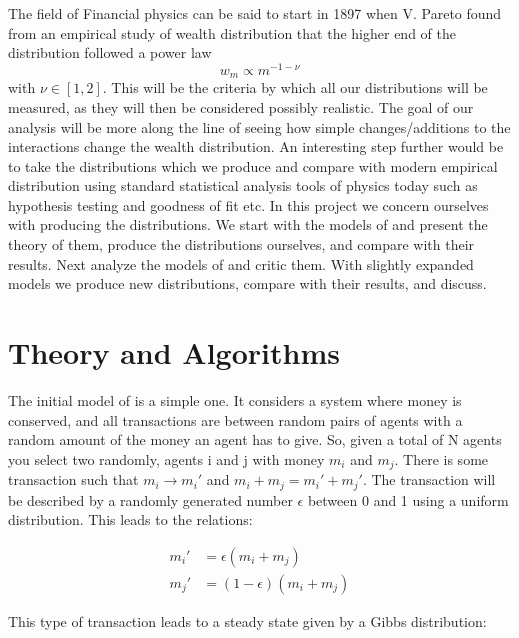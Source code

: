 \documentclass[a4paper,11pt]{article}
\begin{document}
{The field of Financial physics can be said to start in 1897 when V. Pareto \cite{Pareto_1897} found from an empirical study of wealth distribution that the higher end of the distribution followed a power law
 \begin{equation}
 w_m \propto m^{-1-\nu}
 \label{powerLaw}
 \end{equation}
with $\nu \in [1,2]$. This will be the criteria by which all our distributions will be measured, as they will then be considered possibly realistic. The goal of our analysis will be more along the line of seeing how simple changes/additions to the interactions change the wealth distribution. An interesting step further would be to take the distributions which we produce and compare with modern empirical distribution using standard statistical analysis tools of physics today such as hypothesis testing and goodness of fit etc. In this project we concern ourselves with producing the distributions. We start with the models of \cite{GibbsVsnon-Gibbs} and present the theory of them, produce the distributions ourselves, and compare with their results. Next analyze the models of \cite{AgentBasedModels} and critic them. With slightly expanded models we produce new distributions, compare with their results, and discuss.





\section*{Theory and Algorithms}

The initial model of \cite{GibbsVsnon-Gibbs} is a simple one. It considers a system where money is conserved, and all transactions are between random pairs of agents with a random amount of the money an agent has to give. So, given a total of N agents you select two randomly, agents i and j with money $m_i$ and $m_j$. There is some transaction such that $m_i \rightarrow m_i'$ and $m_i + m_j = m_i' + m_j'$. The transaction will be described by a randomly generated number $\epsilon$ between 0 and 1 using a uniform distribution. This leads to the relations:

\begin{align}
m_i' &= \epsilon (m_i + m_j) \\
m_j' &= (1 - \epsilon) (m_i + m_j)
\label{model1}
\end{align}

This type of transaction leads to a steady state given by a Gibbs distribution:

}
\end{document}
